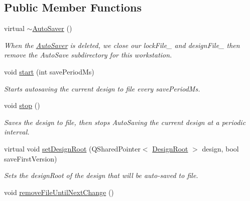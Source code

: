 \subsection*{Public Member Functions}
\begin{DoxyCompactItemize}
\item 
virtual \hyperlink{class_picto_1_1_auto_saver_a97bee7c7983bb8ba0189580248d45f57}{$\sim$\-Auto\-Saver} ()
\begin{DoxyCompactList}\small\item\em When the \hyperlink{class_picto_1_1_auto_saver}{Auto\-Saver} is deleted, we close our lock\-File\-\_\- and design\-File\-\_\- then remove the Auto\-Save subdirectory for this workstation. \end{DoxyCompactList}\item 
\hypertarget{class_picto_1_1_auto_saver_af62ed112fa85c09e4788f3846e42ab60}{void \hyperlink{class_picto_1_1_auto_saver_af62ed112fa85c09e4788f3846e42ab60}{start} (int save\-Period\-Ms)}\label{class_picto_1_1_auto_saver_af62ed112fa85c09e4788f3846e42ab60}

\begin{DoxyCompactList}\small\item\em Starts autosaving the current design to file every save\-Period\-Ms. \end{DoxyCompactList}\item 
\hypertarget{class_picto_1_1_auto_saver_aff98146527c802af3b1728d3321f9c49}{void \hyperlink{class_picto_1_1_auto_saver_aff98146527c802af3b1728d3321f9c49}{stop} ()}\label{class_picto_1_1_auto_saver_aff98146527c802af3b1728d3321f9c49}

\begin{DoxyCompactList}\small\item\em Saves the design to file, then stops Auto\-Saving the current design at a periodic interval. \end{DoxyCompactList}\item 
virtual void \hyperlink{class_picto_1_1_auto_saver_a0104d42c131f38a258bb0c0d14678241}{set\-Design\-Root} (Q\-Shared\-Pointer$<$ \hyperlink{class_picto_1_1_design_root}{Design\-Root} $>$ design, bool save\-First\-Version)
\begin{DoxyCompactList}\small\item\em Sets the design\-Root of the design that will be auto-\/saved to file. \end{DoxyCompactList}\item 
\hypertarget{class_picto_1_1_auto_saver_a8323b0f1510370ac878e35c4455e28be}{void \hyperlink{class_picto_1_1_auto_saver_a8323b0f1510370ac878e35c4455e28be}{remove\-File\-Until\-Next\-Change} ()}\label{class_picto_1_1_auto_saver_a8323b0f1510370ac878e35c4455e28be}


\end{DoxyCompactItemize}
